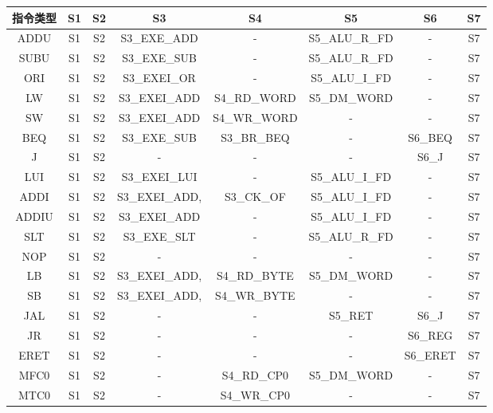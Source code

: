 \documentclass[main.tex]{subfiles}
\begin{document}
\begin{center}
    \begin{tabular}{cccccccc}
        \toprule
        指令类型 & S1 & S2 & S3 & S4 & S5 & S6 & S7 \\
        \midrule
            ADDU    &   S1 & S2 & S3\_EXE\_ADD     &-              &S5\_ALU\_R\_FD   & - & S7 \\
            SUBU    &   S1 & S2 & S3\_EXE\_SUB     &-              &S5\_ALU\_R\_FD   & - & S7 \\
            ORI     &   S1 & S2 & S3\_EXEI\_OR     &-              &S5\_ALU\_I\_FD   & - & S7 \\
            LW      &   S1 & S2 & S3\_EXEI\_ADD    &S4\_RD\_WORD    &S5\_DM\_WORD    & - & S7 \\
            SW      &   S1 & S2 & S3\_EXEI\_ADD    &S4\_WR\_WORD    & -             & - & S7 \\
            BEQ     &   S1 & S2 & S3\_EXE\_SUB     &S3\_BR\_BEQ     & -             &S6\_BEQ  & S7 \\
            J       &   S1 & S2 & -               & -             & -             &S6\_J  & S7 \\
            LUI     &   S1 & S2 & S3\_EXEI\_LUI    &-              &S5\_ALU\_I\_FD   & - & S7 \\
            ADDI    &   S1 & S2 & S3\_EXEI\_ADD,   &S3\_CK\_OF      &S5\_ALU\_I\_FD   & - & S7 \\
            ADDIU   &   S1 & S2 & S3\_EXEI\_ADD    &-              &S5\_ALU\_I\_FD   & - & S7 \\
            SLT     &   S1 & S2 & S3\_EXE\_SLT     &-              &S5\_ALU\_R\_FD   & - & S7 \\
            NOP     &   S1 & S2 &-                & -             & -             & -  & S7 \\
            LB      &   S1 & S2 & S3\_EXEI\_ADD,   &S4\_RD\_BYTE    & S5\_DM\_WORD   &-  & S7 \\
            SB      &   S1 & S2 & S3\_EXEI\_ADD,   &S4\_WR\_BYTE    & -             & -  & S7 \\
            JAL     &   S1 & S2 &-                & -             &S5\_RET        &S6\_J  & S7 \\
            JR      &   S1 & S2 &-                & -             & -             &S6\_REG  & S7 \\
            ERET    &   S1 & S2 &-                & -             & -             &S6\_ERET & S7 \\
            MFC0    &   S1 & S2 &-                & S4\_RD\_CP0     & S5\_DM\_WORD  &- & S7 \\
            MTC0    &   S1 & S2 &-                & S4\_WR\_CP0     & -             &- & S7 \\
        \bottomrule
    \end{tabular}
\end{center}
\end{document}
